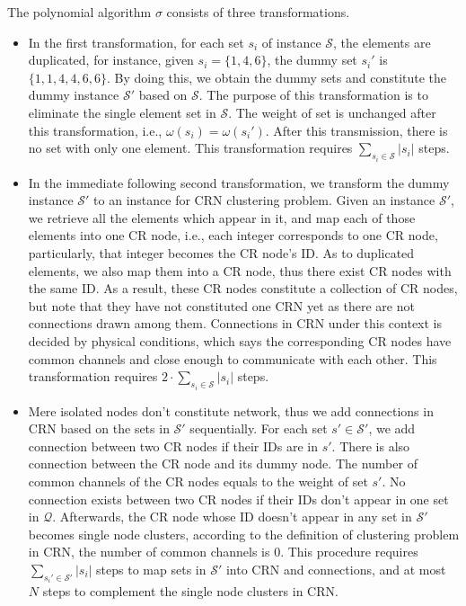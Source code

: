 \documentclass[10pt,journal,compsoc]{IEEEtran}
\makeatletter
\theoremstyle{mytheoremstyle}
\theoremstyle{mytheoremstyle}
\theoremstyle{mytheoremstyle}
\renewenvironment{proof}[1][\proofname]{%
      \par\pushQED{\qed}\fontfamily{ptm}\selectfont%
      \topsep6\p@\@plus6\p@\relax
      \trivlist\item[\hskip\labelsep\bfseries#1\@addpunct{.}]%
      \ignorespaces
    }{%
      \popQED\endtrivlist\@endpefalse
    }
\newcommand{\ie}{i.e., }
\makeatother
\begin{document}
\begin{proof}
The polynomial algorithm $\sigma$ consists of three transformations.
\begin{itemize}
\item In the first transformation, for each set $s_i$ of instance $\mathcal{S}$, the elements are duplicated, for instance, given $s_i=\{1, 4, 6\}$, the dummy set $s_i'$ is $\{1,1,4,4,6,6\}$.
By doing this, we obtain the dummy sets and constitute the dummy instance $\mathcal{S}'$ based on $\mathcal{S}$.
The purpose of this transformation is to eliminate the single element set in $\mathcal{S}$.
The weight of set is unchanged after this transformation, \ie $\omega(s_i)=\omega(s_i')$.
After this transmission, there is no set with only one element.
This transformation requires $\sum_{s_i \in \mathcal{S}} |s_i|$ steps.
\item In the immediate following second transformation, we transform the dummy instance $\mathcal{S}'$ to an instance for CRN clustering problem.
Given an instance $\mathcal{S}'$, we retrieve all the elements which appear in it, and map each of those elements into one CR node, \ie each integer corresponds to one CR node, particularly, that integer becomes the CR node's ID.
As to duplicated elements, we also map them into a CR node, thus there exist CR nodes with the same ID.
As a result, these CR nodes constitute a collection of CR nodes, but note that they have not constituted one CRN yet as there are not connections drawn among them.
Connections in CRN under this context is decided by physical conditions, which says the corresponding CR nodes have common channels and close enough to communicate with each other.
This transformation requires $2\cdot\sum_{s_i \in \mathcal{S}} |s_i|$ steps.
\item Mere isolated nodes don't constitute network, thus we add connections in CRN based on the sets in $\mathcal{S}'$ sequentially.
For each set $s'\in \mathcal{S}'$, we add connection between two CR nodes if their IDs are in $s'$.
There is also connection between the CR node and its dummy node.
The number of common channels of the CR nodes equals to the weight of set $s'$.
No connection exists between two CR nodes if their IDs don't appear in one set in $\mathcal{Q}$.
Afterwards, the CR node whose ID doesn't appear in any set in $\mathcal{S'}$ becomes single node clusters, according to the definition of clustering problem in CRN, the number of common channels is 0.
This procedure requires $\sum_{s_i' \in \mathcal{S}'} |s_i|$ steps to map sets in $\mathcal{S}'$ into CRN and connections, and at most $N$ steps to complement the single node clusters in CRN.


\end{itemize}
\end{proof}
\end{document}
